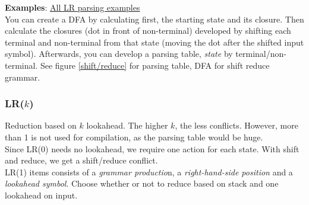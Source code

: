 \textbf{Examples}: \href{https://users-cs.au.dk/~askarov/dovs/lr/}{All LR parsing examples}\\

You can create a DFA by calculating first, the starting state and its closure. Then calculate the closures (dot in front of non-terminal) developed by shifting each terminal and non-terminal from that state (moving the dot after the shifted input symbol). Afterwards, you can develop a parsing table, \textit{state} by terminal/non-terminal. See figure \ref{shift/reduce} for parsing table, DFA for shift reduce grammar.

\subsubsection{LR($k$)}

Reduction based on $k$ lookahead. The higher $k$, the less conflicts. However, more than 1 is not used for compilation, as the parsing table would be huge.\\

Since LR(0) needs no lookahead, we require one action for each state. With shift and reduce, we get a shift/reduce conflict.\\

LR(1) items consists of a \textit{grammar productio}n, a \textit{right-hand-side position} and a \textit{lookahead symbol}. Choose whether or not to reduce based on stack and one lookahead on input.\\



